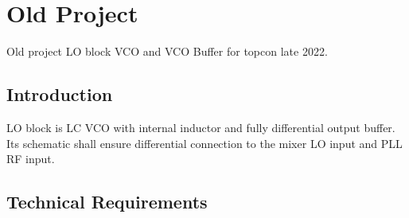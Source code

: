 
\newpage

\section{Old Project}

Old project LO block VCO and VCO Buffer for topcon late 2022. %

\subsection{Introduction} %

LO block is LC VCO with internal inductor and fully differential output buffer. Its schematic shall ensure differential connection to the mixer LO input and PLL RF input.

\subsection{Technical Requirements}


